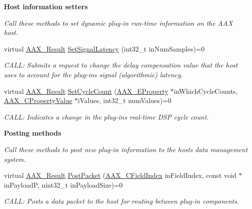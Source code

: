 \begin{Indent}\textbf{ Host information setters}\par
{\em Call these methods to set dynamic plug-\/in run-\/time information on the A\+AX host. }\begin{DoxyCompactItemize}
\item 
virtual \mbox{\hyperlink{a00392_a4d8f69a697df7f70c3a8e9b8ee130d2f}{A\+A\+X\+\_\+\+Result}} \mbox{\hyperlink{a01789_af2c648879419d94971c1308d8698601f}{Set\+Signal\+Latency}} (int32\+\_\+t in\+Num\+Samples)=0
\begin{DoxyCompactList}\small\item\em C\+A\+LL\+: Submits a request to change the delay compensation value that the host uses to account for the plug-\/in\textquotesingle{}s signal (algorithmic) latency. \end{DoxyCompactList}\item 
virtual \mbox{\hyperlink{a00392_a4d8f69a697df7f70c3a8e9b8ee130d2f}{A\+A\+X\+\_\+\+Result}} \mbox{\hyperlink{a01789_a1a654f682357d48bafd506cbbea2ae25}{Set\+Cycle\+Count}} (\mbox{\hyperlink{a00662_a13e384f22825afd3db6d68395b79ce0d}{A\+A\+X\+\_\+\+E\+Property}} $\ast$in\+Which\+Cycle\+Counts, \mbox{\hyperlink{a00392_ab247c0d8686c14e05cbb567ef276f249}{A\+A\+X\+\_\+\+C\+Property\+Value}} $\ast$i\+Values, int32\+\_\+t num\+Values)=0
\begin{DoxyCompactList}\small\item\em C\+A\+LL\+: Indicates a change in the plug-\/in\textquotesingle{}s real-\/time D\+SP cycle count. \end{DoxyCompactList}\end{DoxyCompactItemize}
\end{Indent}
\begin{Indent}\textbf{ Posting methods}\par
{\em Call these methods to post new plug-\/in information to the host\textquotesingle{}s data management system. }\begin{DoxyCompactItemize}
\item 
virtual \mbox{\hyperlink{a00392_a4d8f69a697df7f70c3a8e9b8ee130d2f}{A\+A\+X\+\_\+\+Result}} \mbox{\hyperlink{a01789_ae5dd2b5925dbc181513bca1c4ac5e716}{Post\+Packet}} (\mbox{\hyperlink{a00392_ae807f8986143820cfb5d6da32165c9c7}{A\+A\+X\+\_\+\+C\+Field\+Index}} in\+Field\+Index, const void $\ast$in\+PayloadP, uint32\+\_\+t in\+Payload\+Size)=0
\begin{DoxyCompactList}\small\item\em C\+A\+LL\+: Posts a data packet to the host for routing between plug-\/in components. \end{DoxyCompactList}\end{DoxyCompactItemize}
\end{Indent}
